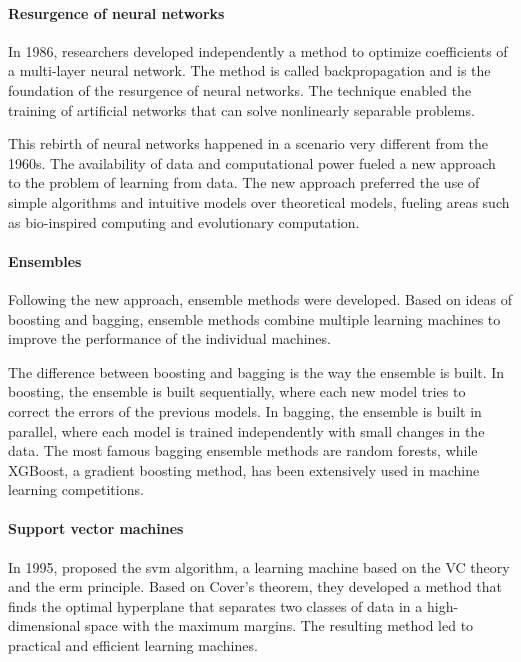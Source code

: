 \paragraph{Resurgence of neural networks}

In 1986, researchers developed independently a method to optimize coefficients of a
multi-layer neural
network.  The method is called backpropagation and
is the foundation of the resurgence of neural networks.  The technique enabled the
training of artificial networks that can solve nonlinearly separable problems.

This rebirth of neural networks happened in a scenario very different from the 1960s.
The availability of data and computational power fueled a new approach to the problem of
learning from data.  The new approach preferred the use of simple algorithms and
intuitive models over theoretical models, fueling areas such as bio-inspired computing and
evolutionary computation.

\paragraph{Ensembles}

Following the new approach, ensemble methods were developed.  Based on ideas of
boosting and bagging, ensemble
methods combine multiple learning machines to improve the performance of the individual
machines.

The difference between boosting and bagging is the way the ensemble is built.  In
boosting, the ensemble is built sequentially, where each new model tries to correct the
errors of the previous models.  In bagging, the ensemble is built in parallel, where each
model is trained independently with small changes in the data.  The most famous bagging
ensemble methods are random forests, while XGBoost, a gradient
boosting method, has been extensively used in machine learning
competitions.

\paragraph{Support vector machines}

In 1995, \textcite{Cortes1995} proposed the \gls{svm} algorithm, a
learning machine based on the VC theory and the \gls{erm} principle.  Based on Cover's
theorem, they developed a method that finds the optimal hyperplane
that separates two classes of data in a high-dimensional space with the maximum margins.
The resulting method led to practical and efficient learning machines.

